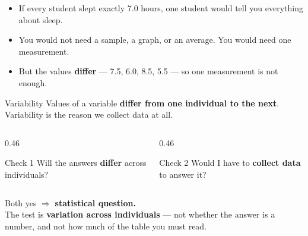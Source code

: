 \documentclass[aspectratio=169, 11pt]{beamer}
\newcommand{\redink}[1]{{\color{redacc}\bfseries #1}}
\begin{document}
\begin{frame}[t, plain]
  \vspace{6pt}
  \begin{itemize}\setlength{\itemsep}{10pt}
    \item If every student slept exactly 7.0 hours, one student would tell you everything
          about sleep.
    \item You would not need a sample, a graph, or an average. You would need
          one measurement.
    \item But the values \textbf{differ} --- 7.5, 6.0, 8.5, 5.5 --- so one measurement
          is not enough.
  \end{itemize}
  \vspace{10pt}
  \begin{block}{Variability}
    Values of a variable \textbf{differ from one individual to the next}. Variability
    is the reason we collect data at all.
  \end{block}
\end{frame}

\begin{frame}[t, plain]
  \vspace{8pt}
  \begin{columns}[t]
    \begin{column}{0.46\textwidth}
      \begin{block}{Check 1}
        Will the answers \textbf{differ} across individuals?
      \end{block}
    \end{column}
    \begin{column}{0.46\textwidth}
      \begin{block}{Check 2}
        Would I have to \textbf{collect data} to answer it?
      \end{block}
    \end{column}
  \end{columns}
  \vspace{16pt}
  \begin{center}
    {\large Both yes $\Rightarrow$ \textbf{\color{navy}statistical question.}}\\[8pt]
    {\small The test is \redink{variation across individuals} --- not whether the answer is
    a number, and not how much of the table you must read.}
  \end{center}
\end{frame}
\end{document}
